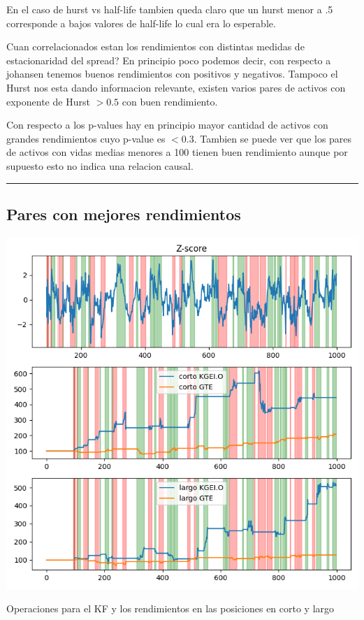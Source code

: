 \documentclass{myarticle}
\begin{document}
En el caso de hurst vs half-life tambien queda claro que un hurst menor a .5 corresponde a bajos valores de half-life lo cual era lo esperable.

Cuan correlacionados estan los rendimientos con distintas medidas de estacionaridad del spread? En principio poco podemos decir, con respecto a johansen tenemos buenos rendimientos con positivos y negativos. Tampoco el Hurst nos esta dando informacion relevante, existen varios pares de activos con exponente de Hurst \(> 0.5\) con buen rendimiento.

Con respecto a los p-values hay en principio mayor cantidad de activos con grandes rendimientos cuyo p-value es \(< 0.3\).  Tambien se puede ver que los pares de activos con vidas medias menores a 100 tienen buen rendimiento aunque por supuesto esto no indica una relacion causal.


\noindent\rule{\textwidth}{0.5pt}
\subsection{Pares con mejores rendimientos}
\label{sec:org522aa92}

\begin{center}
\includegraphics[width=.9\linewidth]{./fig/best_pairs_asset_kf_1000_capital1.png}
\end{center}

Operaciones para el KF y los rendimientos en las posiciones en corto y largo
\end{document}
